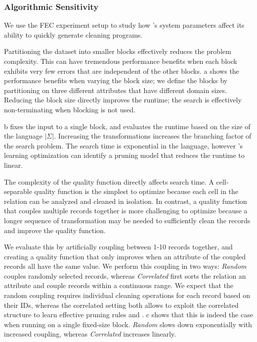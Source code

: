 \subsubsection{Algorithmic Sensitivity}
We use the FEC experiment setup to study how \sys's system parameters affect its ability to quickly generate cleaning programs. 

 Partitioning the dataset into smaller blocks effectively reduces the problem complexity.  This can have tremendous performance benefits when each block exhibits very few errors that are independent of the other blocks.  a shows the performance benefits when varying the block size; we define the blocks by partitioning on three different attributes that have different domain sizes.  Reducing the block size directly improves the runtime; the search is effectively non-terminating when blocking is not used.    

 b fixes the input to a single block, and evaluates the runtime based on the size of the language $|\Sigma|$.  Increasing the transformations increases the branching factor of the search problem. The search time is exponential in the language, however \sys's learning optimization can identify a pruning model that reduces the runtime to linear.

 The complexity of the quality function directly affects search time.  A cell-separable quality function is the simplest to optimize because each cell in the relation can be analyzed and cleaned in isolation.  In contrast, a quality function that couples multiple records together is more challenging to optimize because a longer sequence of transformation may be needed to sufficiently clean the records and improve the quality function.  

We evaluate this by artificially coupling between 1-10 records together, and creating a quality function that only improves when an attribute of the coupled records all have the same value.  We perform this coupling in two ways: {\it Random} couples randomly selected records, whereas {\it Correlated} first sorts the relation an attribute and couple records within a continuous range.  We expect that the random coupling requires individual cleaning operations for each record based on their IDs, whereas the correlated setting both allows \sys to exploit the correlated structure to learn effective pruning rules and .  c shows that this is indeed the case when running \sys on a single fixed-size block. {\it Random} slows down exponentially with increased coupling, whereas {\it Correlated} increases linearly.

